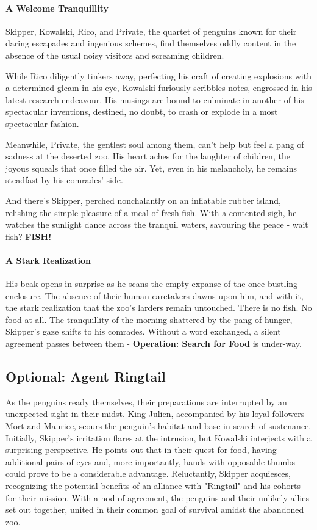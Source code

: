 {\entryfont \paragraph*{A Welcome Tranquillity}
Skipper, Kowalski, Rico, and Private, the quartet of penguins known for their daring escapades and ingenious schemes, find themselves oddly content in the absence of the usual noisy visitors and screaming children.

While Rico diligently tinkers away, perfecting his craft of creating explosions with a determined gleam in his eye, Kowalski furiously scribbles notes, engrossed in his latest research endeavour. His musings are bound to culminate in another of his spectacular inventions, destined, no doubt, to crash or explode in a most spectacular fashion.

Meanwhile, Private, the gentlest soul among them, can't help but feel a pang of sadness at the deserted zoo. His heart aches for the laughter of children, the joyous squeals that once filled the air. Yet, even in his melancholy, he remains steadfast by his comrades' side.

And there's Skipper, perched nonchalantly on an inflatable rubber island, relishing the simple pleasure of a meal of fresh fish. With a contented sigh, he watches the sunlight dance across the tranquil waters, savouring the peace - wait fish? \textbf{FISH!}\\}

{\entryfont \paragraph*{A Stark Realization}
His beak opens in surprise as he scans the empty expanse of the once-bustling enclosure. The absence of their human caretakers dawns upon him, and with it, the stark realization that the zoo's larders remain untouched. There is no fish. No food at all. The tranquillity of the morning shattered by the pang of hunger, Skipper's gaze shifts to his comrades. Without a word exchanged, a silent agreement passes between them - \textbf{Operation: Search for Food} is under-way.}

\subsection*{Optional: Agent Ringtail}
{\entryfont As the penguins ready themselves, their preparations are interrupted by an unexpected sight in their midst. King Julien, accompanied by his loyal followers Mort and Maurice, scours the penguin's habitat and base in search of sustenance. Initially, Skipper's irritation flares at the intrusion, but Kowalski interjects with a surprising perspective. He points out that in their quest for food, having additional pairs of eyes and, more importantly, hands with opposable thumbs could prove to be a considerable advantage. Reluctantly, Skipper acquiesces, recognizing the potential benefits of an alliance with "Ringtail" and his cohorts for their mission. With a nod of agreement, the penguins and their unlikely allies set out together, united in their common goal of survival amidst the abandoned zoo.}

